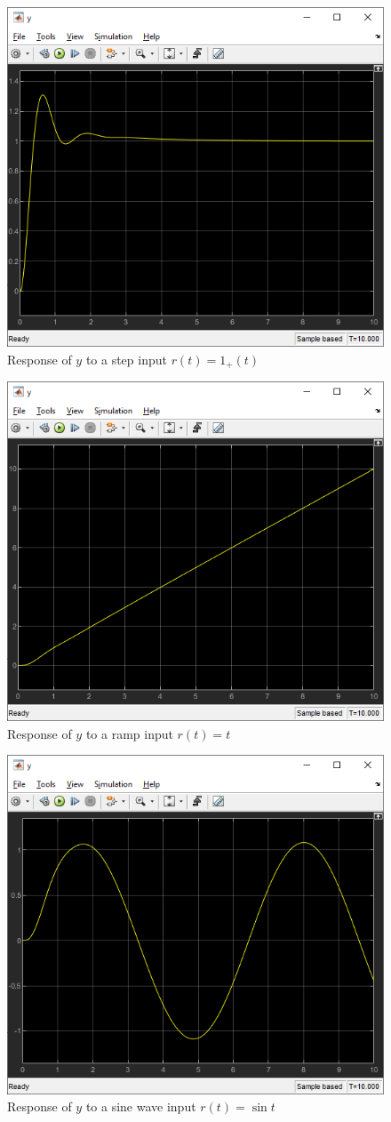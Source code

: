 \subsection{}
\begin{figure}[h]
    \centering
    \includegraphics[width=0.5\linewidth]{Questions/Figures/q2plot1.png}
    \caption{Response of $y$ to a step input $r(t) = 1_{+}(t)$}
    \label{fig:q2plot1}
\end{figure}
\begin{figure}[h]
    \centering
    \includegraphics[width=0.5\linewidth]{Questions/Figures/q2plot2.png}
    \caption{Response of $y$ to a ramp input $r(t) = t$}
    \label{fig:q2plot2}
\end{figure}
\begin{figure}[h]
    \centering
    \includegraphics[width=0.5\linewidth]{Questions/Figures/q2plot3.png}
    \caption{Response of $y$ to a sine wave input $r(t) = \sin t$}
    \label{fig:q2plot3}
\end{figure}
